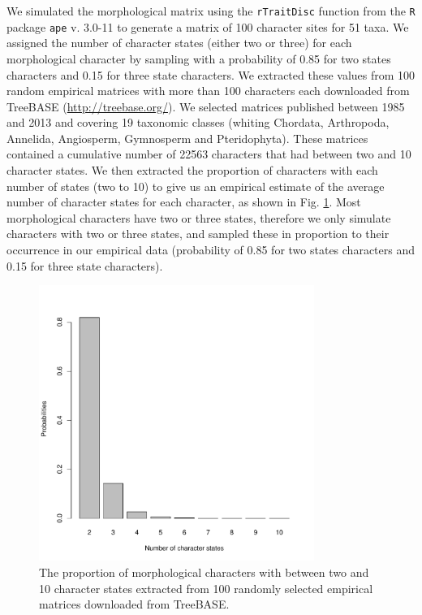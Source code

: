 We simulated the morphological matrix using the \texttt{rTraitDisc} function from the \texttt{R} package \texttt{ape} v. 3.0-11 \citep{paradisape:2004} to generate a matrix of 100 character sites for 51 taxa.
We assigned the number of character states (either two or three) for each morphological character by sampling with a probability of 0.85 for two states characters and 0.15 for three state characters.
We extracted these values from 100 random empirical matrices with more than 100 characters each downloaded from TreeBASE (\url{http://treebase.org/}).
We selected matrices published between 1985 and 2013 and covering 19 taxonomic classes (whiting Chordata, Arthropoda, Annelida, Angiosperm, Gymnosperm and Pteridophyta).
These matrices contained a cumulative number of 22563 characters that had between two and 10 character states.
We then extracted the proportion of characters with each number of states (two to 10) to give us an empirical estimate of the average number of character states for each character, as shown in Fig. \ref{Fig_AppendixCharacters}.
Most morphological characters have two or three states, therefore we only simulate characters with two or three states, and sampled these in proportion to their occurrence in our empirical data (probability of 0.85 for two states characters and 0.15 for three state characters).

\begin{figure}[!h] %
\centering
    \includegraphics[keepaspectratio=true,width=0.8\textwidth]{TEM/Figures/TEM_Fig-AppendixCharacters.pdf}
\caption[Empirical proportion of morphological characters]{The proportion of morphological characters with between two and 10 character states extracted from 100 randomly selected empirical matrices downloaded from TreeBASE.}
\label{Fig_AppendixCharacters}
\end{figure}


